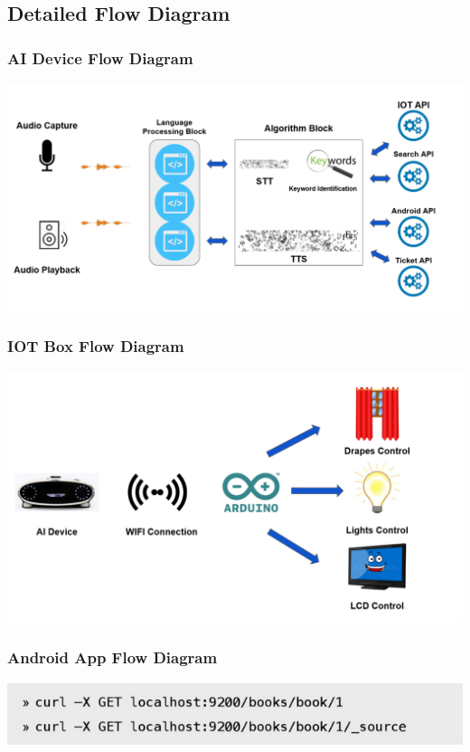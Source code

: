 \documentclass[xcolor=dvipsnames]{beamer}
\begin{document}
\subsection*{Detailed Flow Diagram}
\begin{frame}
\frametitle{AI Device Flow Diagram}
\begin{minipage}{0.8\textwidth}
\centering 
\includegraphics[scale=0.36]{images/Device.png}
\end{minipage}
\end{frame}
\begin{frame}
\frametitle{IOT Box Flow Diagram}
\centering
\includegraphics[scale=0.35]{images/IOT.png}
\end{frame}
\begin{frame}
\frametitle{Android App Flow Diagram}
\centering
\includegraphics[scale=0.32]{q3.png}
\end{frame}
\end{document}
